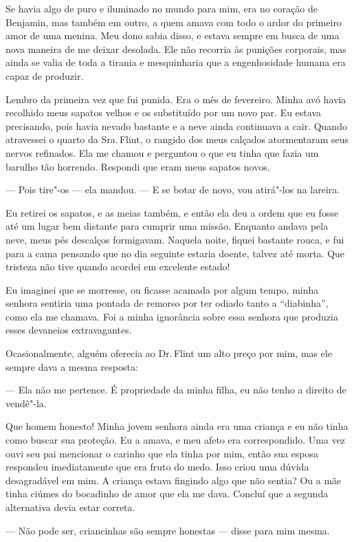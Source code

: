Se havia algo de puro e iluminado no
mundo para mim, era no coração de Benjamin, mas também em outro, a quem
amava com todo o ardor do primeiro amor de uma menina. Meu dono sabia
disso, e estava sempre em busca de uma nova maneira de me deixar
desolada. Ele não recorria às punições corporais, mas ainda se valia de
toda a tirania e mesquinharia que a engenhosidade humana era capaz de
produzir.

Lembro da primeira vez que fui punida.
Era o mês de fevereiro. Minha avó havia recolhido meus sapatos velhos e
os substituído por um novo par. Eu estava precisando, pois havia nevado
bastante e a neve ainda continuava a cair. Quando atravessei o quarto da
Sra.\,Flint, o rangido dos meus calçados atormentaram seus nervos
refinados. Ela me chamou e perguntou o que eu tinha que fazia um barulho
tão horrendo. Respondi que eram meus sapatos novos.

--- Pois tire"-os --- ela mandou. --- E se botar de novo, vou atirá"-los
na lareira.

Eu retirei os sapatos, e as meias
também, e então ela deu a ordem que eu fosse até um lugar bem distante
para cumprir uma missão. Enquanto andava pela neve, meus pés descalços
formigavam. Naquela noite, fiquei bastante rouca, e fui para a cama
pensando que no dia seguinte estaria doente, talvez até morta. Que
tristeza não tive quando acordei em excelente estado!

Eu imaginei que se morresse, ou ficasse
acamada por algum tempo, minha senhora sentiria uma pontada de remorso
por ter odiado tanto a ``diabinha'', como ela me chamava. Foi a minha
ignorância sobre essa senhora que produzia esses devaneios
extravagantes.

Ocasionalmente, alguém oferecia ao Dr.\,Flint um alto preço por mim, mas ele sempre dava a mesma resposta:

--- Ela não me pertence. É propriedade da minha filha, eu não tenho a
direito de vendê"-la.

Que homem honesto! Minha jovem senhora ainda era uma criança e eu não
tinha como buscar sua proteção. Eu a amava, e meu afeto era
correspondido. Uma vez ouvi seu pai mencionar o carinho que ela tinha
por mim, então sua esposa respondeu imediatamente que era fruto do medo.
Isso criou uma dúvida desagradável em mim. A criança estava fingindo
algo que não sentia? Ou a mãe tinha ciúmes do bocadinho de amor que ela
me dava. Concluí que a segunda alternativa devia estar correta.

--- Não pode ser, criancinhas são sempre honestas --- disse para mim
mesma.

